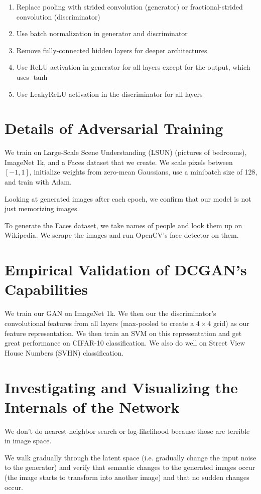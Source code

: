 \documentclass[a4paper]{article}
\begin{document}
\begin{enumerate}
  \item Replace pooling with strided convolution (generator) or
  fractional-strided convolution (discriminator)
  \item Use batch normalization in generator and discriminator
  \item Remove fully-connected hidden layers for deeper architectures
  \item Use ReLU activation in generator for all layers except for the output,
  which uses $\tanh$
  \item Use LeakyReLU activation in the discriminator for all layers
\end{enumerate}

\section{Details of Adversarial Training}
We train on Large-Scale Scene Understanding (LSUN) (pictures of bedrooms),
ImageNet 1k, and a Faces dataset that we create.
We scale pixels between $[-1, 1]$, initialize weights from
zero-mean Gaussians, use a minibatch size of 128, and train with Adam.

Looking at generated images after each epoch, we confirm that our model is
not just memorizing images.

To generate the Faces dataset, we take names of people and look them up on
Wikipedia. We scrape the images and run OpenCV's face detector on them.

\section{Empirical Validation of DCGAN's Capabilities}
We train our GAN on ImageNet 1k. We then our the discriminator's convolutional
features from all layers (max-pooled to create a $4 \times 4$ grid)
as our feature representation. We then train an SVM on this representation and
get great performance on CIFAR-10 classification. We also do well on
Street View House Numbers (SVHN) classification.

\section{Investigating and Visualizing the Internals of the Network}
We don't do nearest-neighbor search or log-likelihood because those are terrible
in image space.

We walk gradually through the latent space (i.e. gradually change the
input noise to the generator) and verify that semantic changes to the generated
images occur (the image starts to transform into another image) and that no
sudden changes occur.
\end{document}
